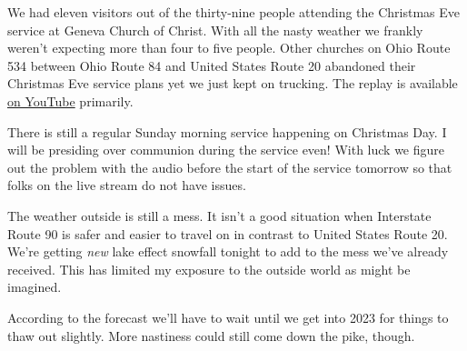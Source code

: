 We had eleven visitors out of the thirty-nine people attending the
Christmas Eve service at Geneva Church of Christ. With all the nasty
weather we frankly weren't expecting more than four to five people.
Other churches on Ohio Route 534 between Ohio Route 84 and United States
Route 20 abandoned their Christmas Eve service plans yet we just kept on
trucking. The replay is available \href{https://youtu.be/6GkQTMBJPq4}{on
YouTube} primarily.

There is still a regular Sunday morning service happening on Christmas
Day. I will be presiding over communion during the service even! With
luck we figure out the problem with the audio before the start of the
service tomorrow so that folks on the live stream do not have issues.

The weather outside is still a mess. It isn't a good situation when
Interstate Route 90 is safer and easier to travel on in contrast to
United States Route 20. We're getting \emph{new} lake effect snowfall
tonight to add to the mess we've already received. This has limited my
exposure to the outside world as might be imagined.

According to the forecast we'll have to wait until we get into 2023 for
things to thaw out slightly. More nastiness could still come down the
pike, though.
